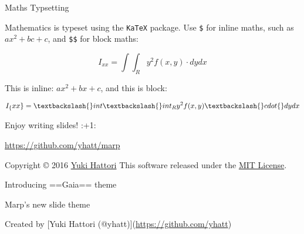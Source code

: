 \documentclass[ignorenonframetext,]{beamer}
\newenvironment{Shaded}{\begin{snugshade}}{\end{snugshade}}
\newcommand{\NormalTok}[1]{{#1}}
\begin{document}
\begin{frame}[fragile]

\begin{block}{Maths Typsetting}

Mathematics is typeset using the \texttt{KaTeX} package. Use \texttt{\$}
for inline maths, such as \(ax^2+bc+c\), and \texttt{\$\$} for block
maths:

\[I_{xx}=\int\int_Ry^2f(x,y)\cdot{}dydx\]

\begin{Shaded}
\begin{Highlighting}[]
\NormalTok{This is inline: $ax^2+bx+c$, and this is block:}

\NormalTok{$$I_\{xx\}=\textbackslash{}int\textbackslash{}int_Ry^2f(x,y)\textbackslash{}cdot\{\}dydx$$}
\end{Highlighting}
\end{Shaded}

\end{block}

\end{frame}

\begin{frame}

\begin{block}{Enjoy writing slides! :+1:}

\begin{block}{\url{https://github.com/yhatt/marp}}

Copyright © 2016 \href{https://github.com/yhatt}{Yuki Hattori} This
software released under the
\href{https://github.com/yhatt/marp/blob/master/LICENSE}{MIT License}.

\end{block}

\end{block}

\end{frame}

\begin{frame}{Introducing ==Gaia== theme}

\begin{block}{Marp's new slide theme}

\begin{block}{Created by {[}Yuki Hattori
(@yhatt){]}(\url{https://github.com/yhatt})}

\end{block}

\end{block}

\end{frame}
\end{document}
